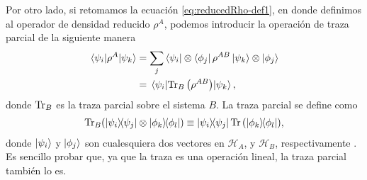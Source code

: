 Por otro lado, si retomamos la ecuación \eqref{eq:reducedRho-def1},
en donde definimos al operador de densidad reducido $\rho^A$, podemos
introducir la operación de traza parcial de la siguiente manera
\begin{align}
	\matrixel{\psi_i}{\rho^A}{\psi_k} &= 
	\sum _j \bra{\psi_i}\ten\bra{\phi_j}\rho^{AB}\ket{\psi_k}\ten\ket{\phi_j}\\
	&=\matrixel{\psi_i}{\Tr_B\qty(\rho^{AB})}{\psi_k},
	\label{eq:partialTrace-def}
\end{align}
donde $\Tr_B$ es la traza parcial sobre el sistema $B$. La traza parcial
se define como \cite{nielsen_chuang_2011}
\begin{align}
	\Tr_B (\dyad{\psi_i}{\psi_j}\otimes \dyad{\phi_k}{\phi_l})
	\equiv
	\dyad{\psi_i}{\psi_j}\Tr \qty(\dyad{\phi_k}{\phi_l}),
	\label{eq:part_trace-def}
\end{align}
donde $\ket{\psi_i}$ y $\ket{\phi_j}$ son cualesquiera dos vectores en
$\mathcal{H}_A$, y $\mathcal{H}_B$, respectivamente
. Es sencillo probar
que, ya que la traza es una operación lineal, la traza parcial también 
lo es.


